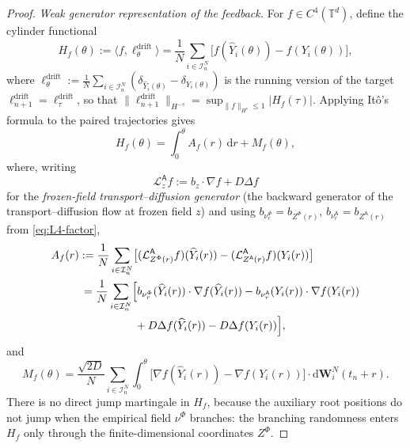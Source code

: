 \documentclass[a4paper,fleqn]{cas-sc}
\theoremstyle{definition}
\theoremstyle{remark}
\begin{document}
\begin{proof}
\medskip
\noindent\emph{Weak generator representation of the feedback.}
For $f\in C^4(\mathbb T^d)$, define the cylinder functional
\[
H_f(\theta):=\bigl\langle f,\ell^{\mathrm{drift}}_\theta\bigr\rangle
=\frac1N\sum_{i\in\mathcal I^N_n}\bigl[f(\widehat Y_i(\theta))-f(Y_i(\theta))\bigr],
\]
where $\ell^{\mathrm{drift}}_\theta:=\frac1N\sum_{i\in\mathcal I^N_n}(\delta_{\widehat Y_i(\theta)}-\delta_{Y_i(\theta)})$
is the running version of the target $\ell^{\mathrm{drift}}_{n+1}=\ell^{\mathrm{drift}}_\tau$, so that
$\|\ell^{\mathrm{drift}}_{n+1}\|_{H^{-s}}=\sup_{\|f\|_{H^s}\le1}|H_f(\tau)|$.
Applying It\^o's formula to the paired trajectories gives
\begin{equation}\label{eq:L4-ito}
H_f(\theta)=\int_0^\theta A_f(r)\,\mathrm dr+M_f(\theta),
\end{equation}
where, writing
\begin{equation}\label{eq:L4-genA}
\mathcal L^{\mathsf A}_z f:=b_z\!\cdot\!\nabla f+D\Delta f
\end{equation}
for the \emph{frozen-field transport--diffusion generator} (the backward generator of the
transport--diffusion flow at frozen field $z$) and using
$b_{\nu^\Phi_r}=b_{Z^\Phi(r)}$, $b_{\nu^{\mathsf A}_r}=b_{Z^{\mathsf A}(r)}$ from
\eqref{eq:L4-factor},
\begin{equation}\label{eq:L4-Af}
\begin{aligned}
A_f(r)
&:=\frac1N\sum_{i\in\mathcal I^N_n}\bigl[(\mathcal L^{\mathsf A}_{Z^\Phi(r)}f)(\widehat Y_i(r))-(\mathcal L^{\mathsf A}_{Z^{\mathsf A}(r)}f)(Y_i(r))\bigr]\\
&\,=\frac1N\sum_{i\in\mathcal I^N_n}\Bigl[
b_{\nu^\Phi_r}(\widehat Y_i(r))\cdot\nabla f(\widehat Y_i(r))
-b_{\nu^{\mathsf A}_r}(Y_i(r))\cdot\nabla f(Y_i(r))\\
&\qquad\qquad\quad+D\Delta f(\widehat Y_i(r))-D\Delta f(Y_i(r))\Bigr],
\end{aligned}
\end{equation}
and
\[
M_f(\theta)=\frac{\sqrt{2D}}{N}\sum_{i\in\mathcal I^N_n}\int_0^\theta
\bigl[\nabla f(\widehat Y_i(r))-\nabla f(Y_i(r))\bigr]\cdot\mathrm d\mathbf W^N_i(t_n+r).
\]
There is no direct jump martingale in $H_f$, because the auxiliary root positions do not
jump when the empirical field $\nu^\Phi$ branches: the branching randomness enters $H_f$
only through the finite-dimensional coordinates $Z^\Phi$.


\end{proof}
\end{document}
